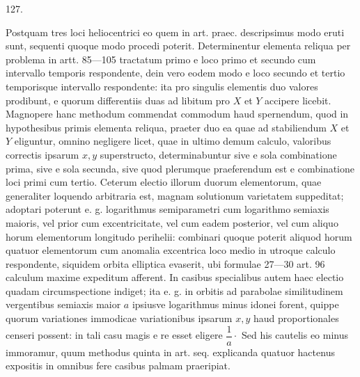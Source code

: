 \par{}\medskip
\begin{center}\hypertarget{native-174-article127}{}127.\end{center}
Postquam tres loci heliocentrici eo quem in art. praec. descripsimus modo
eruti sunt, sequenti quoque modo procedi poterit. Determinentur elementa
reliqua per problema in artt. 85—105 tractatum primo e loco primo et secundo
cum intervallo temporis respondente, dein vero eodem modo e loco secundo
et tertio temporisque intervallo respondente: ita pro singulis elementis
duo valores prodibunt, e quorum differentiis duas ad libitum pro $X$ et $Y$
accipere licebit. Magnopere hanc methodum commendat commodum haud
spernendum, quod in hypothesibus primis elementa reliqua, praeter duo ea
quae ad stabiliendum $X$ et $Y$ eliguntur, omnino negligere licet, quae in ultimo
demum calculo, valoribus correctis ipsarum $x,y$ superstructo, determinabuntur
sive e sola combinatione prima, sive e sola secunda, sive quod plerumque
praeferendum est e combinatione loci primi cum tertio. Ceterum electio illorum
duorum elementorum, quae generaliter loquendo arbitraria est, magnam
solutionum varietatem suppeditat; adoptari poterunt e. g. logarithmus semiparametri
cum logarithmo semiaxis maioris, vel prior cum excentricitate, vel
cum eadem posterior, vel cum aliquo horum elementorum longitudo perihelii:
combinari quoque poterit aliquod horum quatuor elementorum cum anomalia
excentrica loco medio in utroque calculo respondente, siquidem orbita elliptica
evaserit, ubi formulae 27—30 art. 96 calculum maxime expeditum afferent.
In casibus specialibus autem haec electio quadam circumspectione indiget;
ita e. g. in orbitis ad parabolae similitudinem vergentibus semiaxis maior $a$
ipsiusve logarithmus minus idonei forent, quippe quorum variationes immodicae
variationibus ipsarum $x,y$ haud proportionales censeri possent: in tali
casu magis e re esset eligere $\dfrac{1}{a}\mathpunct{\cdot}$ Sed his cautelis eo minus immoramur,
quum methodus quinta in art. seq. explicanda quatuor hactenus expositis in
omnibus fere casibus palmam praeripiat.
